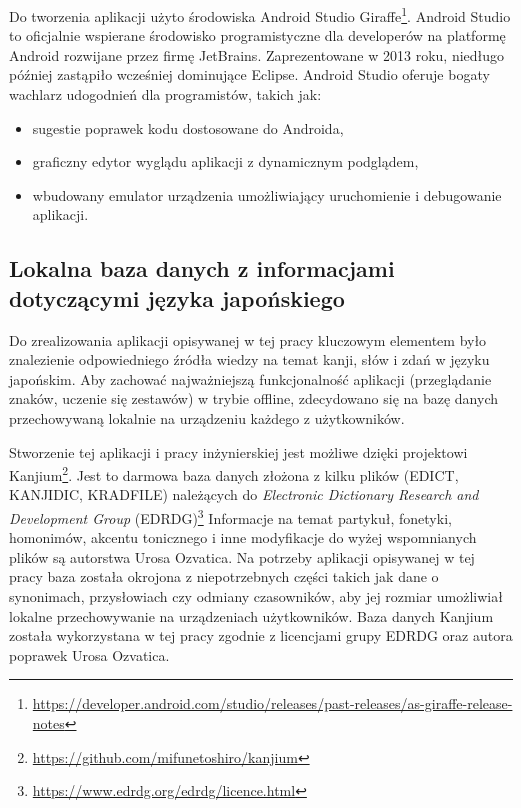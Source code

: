 \documentclass[a4paper,twoside,12pt]{book}
\newcommand{\obcy}[1]{\emph{#1}}
\newcommand{\english}[1]{{\selectlanguage{british}\obcy{#1}}}
\begin{document}
Do tworzenia aplikacji użyto środowiska Android Studio Giraffe\footnote{\url{https://developer.android.com/studio/releases/past-releases/as-giraffe-release-notes}}. Android Studio to oficjalnie wspierane środowisko programistyczne dla developerów na platformę Android rozwijane przez firmę JetBrains. Zaprezentowane w 2013 roku, niedługo później zastąpiło wcześniej dominujące Eclipse. Android Studio oferuje bogaty wachlarz udogodnień dla programistów, takich jak:
\begin{itemize}
\item sugestie poprawek kodu dostosowane do Androida,
\item graficzny edytor wyglądu aplikacji z dynamicznym podglądem,
\item wbudowany emulator urządzenia umożliwiający uruchomienie i debugowanie aplikacji.
\end{itemize}
 
\subsection{Lokalna baza danych z informacjami dotyczącymi języka japońskiego}

Do zrealizowania aplikacji opisywanej w tej pracy kluczowym elementem było znalezienie odpowiedniego źródła wiedzy na temat kanji, słów i zdań w języku japońskim. Aby zachować najważniejszą funkcjonalność aplikacji (przeglądanie znaków, uczenie się zestawów) w trybie offline, zdecydowano się na bazę danych przechowywaną lokalnie na urządzeniu każdego z użytkowników. 

Stworzenie tej aplikacji i pracy inżynierskiej jest możliwe dzięki projektowi Kanjium\footnote{\url{https://github.com/mifunetoshiro/kanjium}}. Jest to darmowa baza danych złożona z kilku plików (EDICT, KANJIDIC, KRADFILE) należących do  \english{Electronic Dictionary Research and Development Group} (EDRDG)\footnote{\url{https://www.edrdg.org/edrdg/licence.html}} Informacje na temat partykuł, fonetyki, homonimów, akcentu tonicznego i inne modyfikacje do wyżej wspomnianych plików są autorstwa Urosa Ozvatica. Na potrzeby aplikacji opisywanej w tej pracy baza została okrojona z niepotrzebnych części takich jak dane o synonimach, przysłowiach czy odmiany czasowników, aby jej rozmiar umożliwiał lokalne przechowywanie na urządzeniach użytkowników. Baza danych Kanjium została wykorzystana w tej pracy zgodnie z licencjami grupy EDRDG oraz autora poprawek Urosa Ozvatica.
\end{document}
